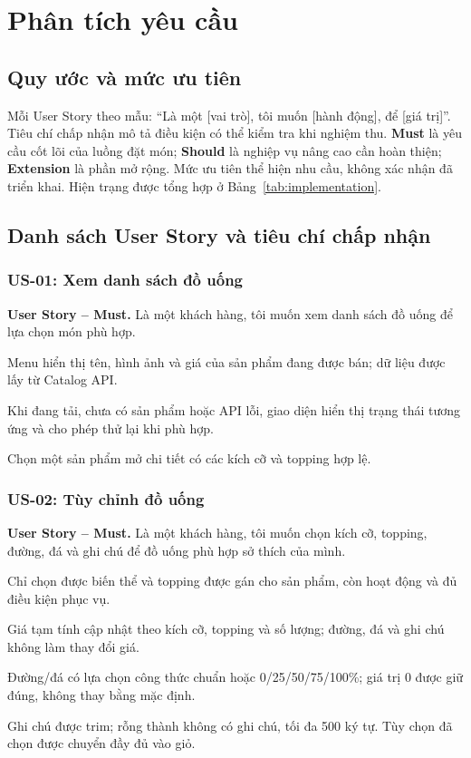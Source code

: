 \chapter{Phân tích yêu cầu}
\label{chap:phan-tich}

\section{Quy ước và mức ưu tiên}
Mỗi User Story theo mẫu: ``Là một [vai trò], tôi muốn [hành động], để
[giá trị]''. Tiêu chí chấp nhận mô tả điều kiện có thể kiểm tra khi nghiệm
thu. \textbf{Must} là yêu cầu cốt lõi của luồng đặt món; \textbf{Should}
là nghiệp vụ nâng cao cần hoàn thiện; \textbf{Extension} là phần mở rộng.
Mức ưu tiên thể hiện nhu cầu, không xác nhận đã triển khai. Hiện trạng
được tổng hợp ở Bảng~\ref{tab:implementation}.

\section{Danh sách User Story và tiêu chí chấp nhận}

\subsection{US-01: Xem danh sách đồ uống}
\label{us:01}
\noindent\textbf{User Story -- Must.}
Là một khách hàng, tôi muốn xem danh sách đồ uống để lựa chọn món phù hợp.
\begin{acceptance}
    \item Menu hiển thị tên, hình ảnh và giá của sản phẩm đang được bán;
    dữ liệu được lấy từ Catalog API.
    \item Khi đang tải, chưa có sản phẩm hoặc API lỗi, giao diện hiển thị
    trạng thái tương ứng và cho phép thử lại khi phù hợp.
    \item Chọn một sản phẩm mở chi tiết có các kích cỡ và topping hợp lệ.
\end{acceptance}

\subsection{US-02: Tùy chỉnh đồ uống}
\label{us:02}
\noindent\textbf{User Story -- Must.}
Là một khách hàng, tôi muốn chọn kích cỡ, topping, đường, đá và ghi chú
để đồ uống phù hợp sở thích của mình.
\begin{acceptance}
    \item Chỉ chọn được biến thể và topping được gán cho sản phẩm, còn
    hoạt động và đủ điều kiện phục vụ.
    \item Giá tạm tính cập nhật theo kích cỡ, topping và số lượng;
    đường, đá và ghi chú không làm thay đổi giá.
    \item Đường/đá có lựa chọn công thức chuẩn hoặc 0/25/50/75/100\%;
    giá trị 0 được giữ đúng, không thay bằng mặc định.
    \item Ghi chú được trim; rỗng thành không có ghi chú, tối đa 500 ký tự.
    Tùy chọn đã chọn được chuyển đầy đủ vào giỏ.
\end{acceptance}

